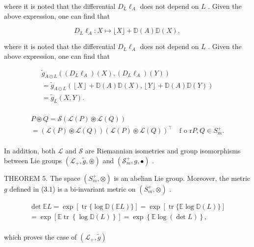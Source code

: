 \documentclass[11pt]{article}
\begin{document}
where it is noted that the differential  $D_{L}\ell_{A}$  does not depend on  $L$ . Given the above expression, one can find that

$$
D _ {L} \ell_ {A}: X \mapsto \lfloor X \rfloor + \mathbb {D} (A) \mathbb {D} (X), \tag {3.2}
$$

where it is noted that the differential  $D_{L}\ell_{A}$  does not depend on  $L$ . Given the above expression, one can find that

$$
\begin{array}{l} \tilde {g} _ {A \odot L} ((D _ {L} \ell_ {A}) (X), (D _ {L} \ell_ {A}) (Y)) \\ = \tilde {g} _ {A \odot L} (\left\lfloor X \right\rfloor + \mathbb {D} (A) \mathbb {D} (X), \left\lfloor Y \right\rfloor + \mathbb {D} (A) \mathbb {D} (Y)) \\ = \tilde {g} _ {L} (X, Y). \\ \end{array}
$$

$$
\begin{array}{l} P \circledast Q = \mathcal {S} (\mathcal {L} (P) \circledast \mathcal {L} (Q)) \\ = \left(\mathcal {L} (P) \circledast \mathcal {L} (Q)\right) \left(\mathcal {L} (P) \circledast \mathcal {L} (Q)\right) ^ {\top} \quad \text {f o r} P, Q \in S _ {m} ^ {+}. \\ \end{array}
$$

In addition, both  $\mathcal{L}$  and  $\mathcal{S}$  are Riemannian isometries and group isomorphisms between Lie groups  $(\mathcal{L}_{+},\tilde{g},\circledast)$  and  $(\mathcal{S}_m^+,g,\bullet)$ .

THEOREM 5. The space  $(S_m^+, \otimes)$  is an abelian Lie group. Moreover, the metric  $g$  defined in (3.1) is a bi-invariant metric on  $(S_m^+, \otimes)$ .

$$
\begin{array}{l} \det  \mathbb {E} L = \exp [ \operatorname {t r} \{\log \mathbb {D} (\mathbb {E} L) \} ] = \exp [ \operatorname {t r} \{\mathbb {E} \log \mathbb {D} (L) \} ] \\ = \exp \left[ \mathbb {E} \operatorname {t r} \left\{\log \mathbb {D} (L) \right\} \right] = \exp \left\{\mathbb {E} \log (\det  L) \right\}, \\ \end{array}
$$

which proves the case of  $(\mathcal{L}_{+},\tilde{g})$
\end{document}
